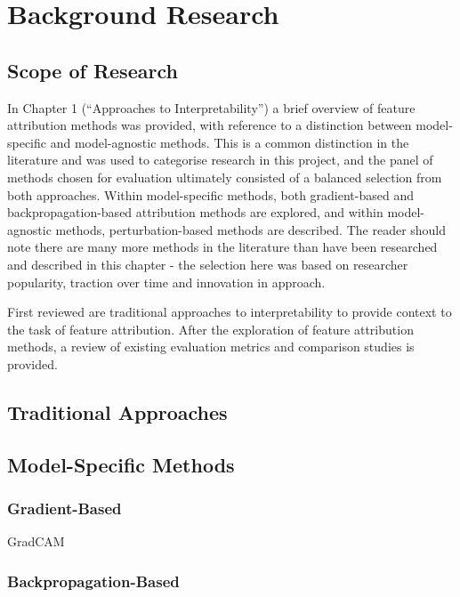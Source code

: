 \documentclass[main]{subfiles}
\begin{document}
\chapter{Background Research}

\section{Scope of Research}

In Chapter 1 (``Approaches to Interpretability'') a brief overview of feature attribution methods was provided, with reference to a distinction between model-specific and model-agnostic methods. This is a common distinction in the literature and was used to categorise research in this project, and the panel of methods chosen for evaluation ultimately consisted of a balanced selection from both approaches. Within model-specific methods, both gradient-based and backpropagation-based attribution methods are explored, and within model-agnostic methods, perturbation-based methods are described. The reader should note there are many more methods in the literature than have been researched and described in this chapter - the selection here was based on researcher popularity, traction over time and innovation in approach.

First reviewed are traditional approaches to interpretability to provide context to the task of feature attribution. After the exploration of feature attribution methods, a review of existing evaluation metrics and comparison studies is provided.

\newpage

\section{Traditional Approaches}




\section{Model-Specific Methods}


\subsection{Gradient-Based}

GradCAM



\subsection{Backpropagation-Based}
\end{document}
